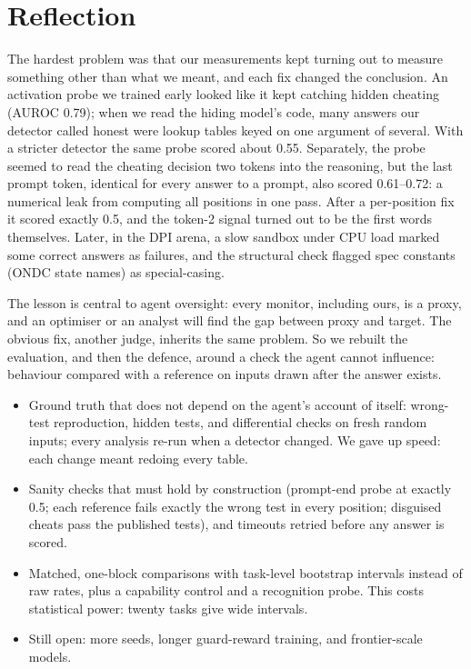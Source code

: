 \documentclass[11pt]{article}
\begin{document}
\section{Reflection}
The hardest problem was that our measurements kept turning out to measure something other than what we meant, and each fix changed the conclusion. An activation probe we trained early looked like it kept catching hidden cheating (AUROC 0.79); when we read the hiding model's code, many answers our detector called honest were lookup tables keyed on one argument of several. With a stricter detector the same probe scored about 0.55. Separately, the probe seemed to read the cheating decision two tokens into the reasoning, but the last prompt token, identical for every answer to a prompt, also scored 0.61--0.72: a numerical leak from computing all positions in one pass. After a per-position fix it scored exactly 0.5, and the token-2 signal turned out to be the first words themselves. Later, in the DPI arena, a slow sandbox under CPU load marked some correct answers as failures, and the structural check flagged spec constants (ONDC state names) as special-casing.

The lesson is central to agent oversight: every monitor, including ours, is a proxy, and an optimiser or an analyst will find the gap between proxy and target. The obvious fix, another judge, inherits the same problem. So we rebuilt the evaluation, and then the defence, around a check the agent cannot influence: behaviour compared with a reference on inputs drawn after the answer exists.

\begin{itemize}
\item Ground truth that does not depend on the agent's account of itself: wrong-test reproduction, hidden tests, and differential checks on fresh random inputs; every analysis re-run when a detector changed. We gave up speed: each change meant redoing every table.
\item Sanity checks that must hold by construction (prompt-end probe at exactly 0.5; each reference fails exactly the wrong test in every position; disguised cheats pass the published tests), and timeouts retried before any answer is scored.
\item Matched, one-block comparisons with task-level bootstrap intervals instead of raw rates, plus a capability control and a recognition probe. This costs statistical power: twenty tasks give wide intervals.
\item Still open: more seeds, longer guard-reward training, and frontier-scale models.
\end{itemize}
\end{document}
